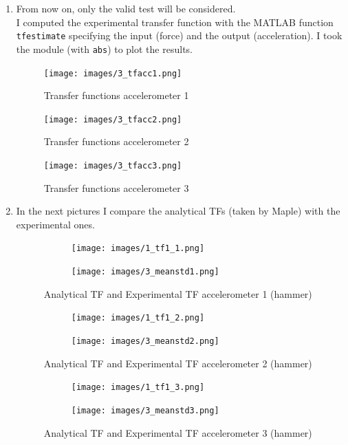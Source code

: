 \documentclass[11pt,a4paper]{article}
\begin{document}
\begin{enumerate}
	\medskip
	
	\item From now on, only the valid test will be considered. \\
	I computed the experimental transfer function with the MATLAB function \texttt{tfestimate} specifying the input (force) and the output (acceleration).
	I took the module (with \texttt{abs}) to plot the results. 
	 \begin{figure}[H]
	 	\centering
	 	\texttt{[image: images/3\_tfacc1.png]}
	 	\caption{Transfer functions accelerometer 1}
	 \end{figure}
	\begin{figure}[H]
		\centering
		\texttt{[image: images/3\_tfacc2.png]}
		\caption{Transfer functions accelerometer 2}
	\end{figure}
	\begin{figure}[H]
		\centering
		\texttt{[image: images/3\_tfacc3.png]}
		\caption{Transfer functions accelerometer 3}
	\end{figure}

	\medskip

	\item In the next pictures I compare the analytical TFs (taken by Maple) with the experimental ones.
	\begin{figure}[H]
		\begin{subfigure}[b]{0.5\textwidth}
			\centering
			\texttt{[image: images/1\_tf1\_1.png]}
		\end{subfigure}
		\hfill
		\begin{subfigure}[b]{0.5\textwidth}
			\centering
			\texttt{[image: images/3\_meanstd1.png]}
		\end{subfigure}
		\caption{Analytical TF and Experimental TF accelerometer 1 (hammer)}
	\end{figure}
	
	\begin{figure}[H]
		\begin{subfigure}[b]{0.5\textwidth}
			\centering
			\texttt{[image: images/1\_tf1\_2.png]}
		\end{subfigure}
		\hfill
		\begin{subfigure}[b]{0.5\textwidth}
			\centering
			\texttt{[image: images/3\_meanstd2.png]}
		\end{subfigure}
		\caption{Analytical TF and Experimental TF accelerometer 2 (hammer)}
	\end{figure}
	
	\begin{figure}[H]
		\begin{subfigure}[b]{0.5\textwidth}
			\centering
			\texttt{[image: images/1\_tf1\_3.png]}
		\end{subfigure}
		\hfill
		\begin{subfigure}[b]{0.5\textwidth}
			\centering
			\texttt{[image: images/3\_meanstd3.png]}
		\end{subfigure}
		\caption{Analytical TF and Experimental TF accelerometer 3 (hammer)}
	\end{figure}


\end{enumerate}
\end{document}
